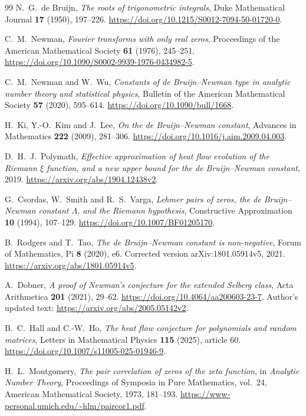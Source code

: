\begin{thebibliography}{99}
N.~G.~de Bruijn, \emph{The roots of trigonometric integrals},
Duke Mathematical Journal \textbf{17} (1950), 197--226.
\url{https://doi.org/10.1215/S0012-7094-50-01720-0}.

C.~M.~Newman, \emph{Fourier transforms with only real zeros},
Proceedings of the American Mathematical Society \textbf{61}
(1976), 245--251.
\url{https://doi.org/10.1090/S0002-9939-1976-0434982-5}.

C.~M.~Newman and W.~Wu, \emph{Constants of de Bruijn--Newman type
in analytic number theory and statistical physics},
Bulletin of the American Mathematical Society \textbf{57}
(2020), 595--614.
\url{https://doi.org/10.1090/bull/1668}.

H.~Ki, Y.-O.~Kim and J.~Lee, \emph{On the de Bruijn--Newman
constant}, Advances in Mathematics \textbf{222} (2009), 281--306.
\url{https://doi.org/10.1016/j.aim.2009.04.003}.

D.~H.~J.~Polymath, \emph{Effective approximation of heat flow
evolution of the Riemann $\xi$ function, and a new upper bound
for the de Bruijn--Newman constant}, 2019.
\url{https://arxiv.org/abs/1904.12438v2}.

G.~Csordas, W.~Smith and R.~S.~Varga, \emph{Lehmer pairs of
zeros, the de Bruijn--Newman constant $\Lambda$, and the Riemann
hypothesis}, Constructive Approximation \textbf{10} (1994), 107--129.
\url{https://doi.org/10.1007/BF01205170}.

B.~Rodgers and T.~Tao, \emph{The de Bruijn--Newman constant is
non-negative}, Forum of Mathematics, Pi \textbf{8} (2020), e6.
Corrected version arXiv:1801.05914v5, 2021.
\url{https://arxiv.org/abs/1801.05914v5}.

A.~Dobner, \emph{A proof of Newman's conjecture for the extended
Selberg class}, Acta Arithmetica \textbf{201} (2021), 29--62.
\url{https://doi.org/10.4064/aa200603-23-7}.
Author's updated text: \url{https://arxiv.org/abs/2005.05142v2}.

B.~C.~Hall and C.-W.~Ho, \emph{The heat flow conjecture for
polynomials and random matrices}, Letters in Mathematical Physics
\textbf{115} (2025), article 60.
\url{https://doi.org/10.1007/s11005-025-01946-9}.

H.~L.~Montgomery, \emph{The pair correlation of zeros of the zeta
function}, in \emph{Analytic Number Theory}, Proceedings of
Symposia in Pure Mathematics, vol.~24, American Mathematical
Society, 1973, 181--193.
\url{https://www-personal.umich.edu/~hlm/paircor1.pdf}.


\end{thebibliography}
